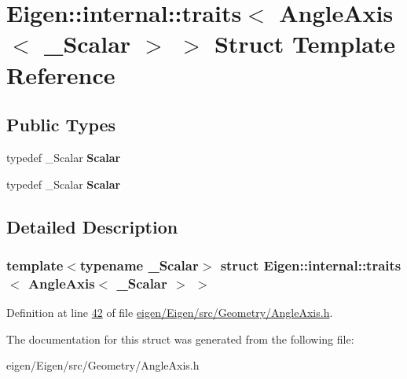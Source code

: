 \hypertarget{struct_eigen_1_1internal_1_1traits_3_01_angle_axis_3_01___scalar_01_4_01_4}{}\section{Eigen\+:\+:internal\+:\+:traits$<$ Angle\+Axis$<$ \+\_\+\+Scalar $>$ $>$ Struct Template Reference}
\label{struct_eigen_1_1internal_1_1traits_3_01_angle_axis_3_01___scalar_01_4_01_4}
\subsection*{Public Types}
\begin{DoxyCompactItemize}
\item 
\mbox{\label{struct_eigen_1_1internal_1_1traits_3_01_angle_axis_3_01___scalar_01_4_01_4_a48938b3bc839f2596f7347d84822ee33}} 
typedef \+\_\+\+Scalar {\bfseries Scalar}
\item 
\mbox{\label{struct_eigen_1_1internal_1_1traits_3_01_angle_axis_3_01___scalar_01_4_01_4_a48938b3bc839f2596f7347d84822ee33}} 
typedef \+\_\+\+Scalar {\bfseries Scalar}
\end{DoxyCompactItemize}


\subsection{Detailed Description}
\subsubsection*{template$<$typename \+\_\+\+Scalar$>$\newline
struct Eigen\+::internal\+::traits$<$ Angle\+Axis$<$ \+\_\+\+Scalar $>$ $>$}



Definition at line \hyperlink{eigen_2_eigen_2src_2_geometry_2_angle_axis_8h_source_l00042}{42} of file \hyperlink{eigen_2_eigen_2src_2_geometry_2_angle_axis_8h_source}{eigen/\+Eigen/src/\+Geometry/\+Angle\+Axis.\+h}.



The documentation for this struct was generated from the following file\+:\begin{DoxyCompactItemize}
\item 
eigen/\+Eigen/src/\+Geometry/\+Angle\+Axis.\+h\end{DoxyCompactItemize}
